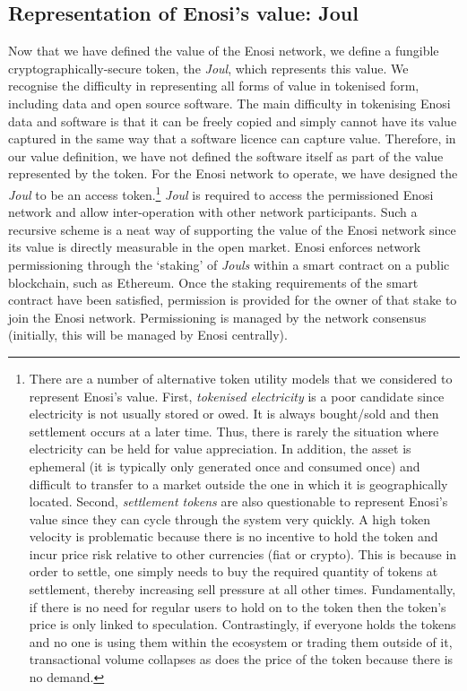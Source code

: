\documentclass[a4paper,12pt,reqno]{amsart}
\theoremstyle{definition}
\begin{document}
\subsection{Representation of Enosi's value: Joul}
Now that we have defined the value of the Enosi network, we define a fungible cryptographically-secure token, the \textit{Joul}, which represents this value. We recognise the difficulty in representing all forms of value in tokenised form, including data and open source software. The main difficulty in tokenising Enosi data and software is that it can be freely copied and simply cannot have its value captured in the same way that a software licence can capture value. Therefore, in our value definition, we have not defined the software itself as part of the value represented by the token. For the Enosi network to operate, we have designed the \textit{Joul} to be an access token.\footnote{ There are a number of alternative token utility models that we considered to represent Enosi's value. First, \textit{tokenised electricity} is a poor candidate since electricity is not usually stored or owed. It is always bought/sold and then settlement occurs at a later time. Thus, there is rarely the situation where electricity can be held for value appreciation. In addition, the asset is ephemeral (it is typically only generated once and consumed once) and  difficult to transfer to a market outside the one in which it is geographically located. Second, \textit{settlement tokens} are also questionable to represent Enosi's value since they can cycle through the system very quickly. A high token velocity is problematic because there is no incentive to hold the token and incur price risk relative to other currencies (fiat or crypto). This is because in order to settle, one simply needs to buy the required quantity of tokens at settlement, thereby increasing sell pressure at all other times. Fundamentally, if there is no need for regular users to hold on to the token then the token’s price is only linked to speculation. Contrastingly, if everyone holds the tokens and no one is using them within the ecosystem or trading them outside of it, transactional volume collapses as does the price of the token because there is no demand.} 
\textit{Joul} is required to access the permissioned Enosi network and allow inter-operation with other network participants. 
Such a recursive scheme is a neat way of supporting the value of the Enosi network since its value is directly measurable in the open market. Enosi enforces network permissioning through the ‘staking’ of \textit{Jouls} within a smart contract on a public blockchain, such as Ethereum. Once the staking requirements of the smart contract have been satisfied, permission is provided for the owner of that stake to join the Enosi network. Permissioning is managed by the network consensus (initially, this will be managed by Enosi centrally).
\end{document}
